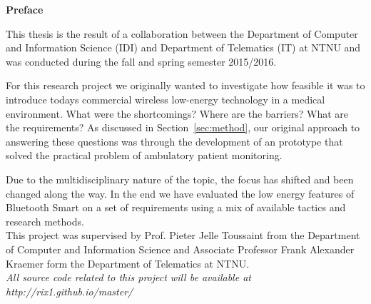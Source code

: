 	\noindent \textbf{Preface}
  \newline
  	
\noindent  
This thesis is the result of a collaboration between the Department of Computer and Information Science (IDI) and Department of Telematics (IT) at NTNU and was conducted during the fall and spring semester 2015/2016.

For this research project we originally wanted to investigate how feasible it was to introduce todays commercial wireless low-energy technology in a medical environment. What were the shortcomings? Where are the barriers? What are the requirements? As discussed in Section~\ref{sec:method}, our original approach to answering these questions was through the development of an prototype that solved the practical problem of ambulatory patient monitoring.

Due to the multidisciplinary nature of the topic, the focus has shifted and been changed along the way. In the end we have evaluated the low energy features of Bluetooth Smart on a set of requirements using a mix of available tactics and research methods.
\\
\newline
\noindent
This project was supervised by Prof. Pieter Jelle Toussaint from the Department of Computer and Information Science and Associate Professor Frank Alexander Kraemer form the Department of Telematics at NTNU.
\\
\newline
\noindent
\textit{All source code related to this project will be available at http://rix1.github.io/master/}